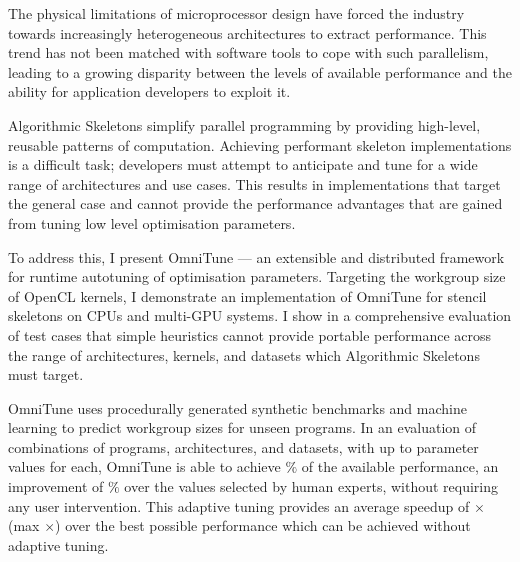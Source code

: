 The physical limitations of microprocessor design have forced the
industry towards increasingly heterogeneous architectures to extract
performance. This trend has not been matched with software tools to
cope with such parallelism, leading to a growing disparity between the
levels of available performance and the ability for application
developers to exploit it.

Algorithmic Skeletons simplify parallel programming by providing
high-level, reusable patterns of computation. Achieving performant
skeleton implementations is a difficult task; developers must attempt
to anticipate and tune for a wide range of architectures and use
cases. This results in implementations that target the general case
and cannot provide the performance advantages that are gained from
tuning low level optimisation parameters.

To address this, I present OmniTune --- an extensible and distributed
framework for runtime autotuning of optimisation parameters. Targeting
the workgroup size of OpenCL kernels, I demonstrate an implementation
of OmniTune for stencil skeletons on CPUs and multi-GPU systems. I
show in a comprehensive evaluation of 
test cases that simple heuristics cannot provide portable performance
across the range of architectures, kernels, and datasets which
Algorithmic Skeletons must target.


OmniTune uses procedurally generated synthetic benchmarks and machine
learning to predict workgroup sizes for unseen programs. In an
evaluation of  combinations of programs,
architectures, and datasets, with up to 
parameter values for each, OmniTune is able to achieve
$\%$ of the available
performance, an improvement of
$\%$ over the
values selected by human experts, without requiring any user
intervention. This adaptive tuning provides an average speedup of
$\times$ (max
$\times$) over the best
possible performance which can be achieved without adaptive tuning.
